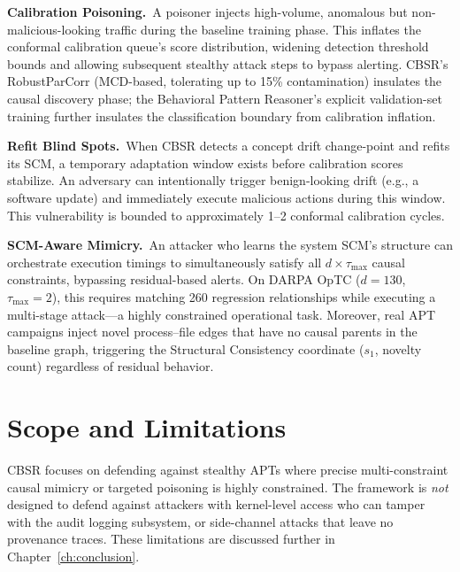 \textbf{Calibration Poisoning.}~A poisoner injects high-volume, anomalous but non-malicious-looking
traffic during the baseline training phase. This inflates the conformal calibration queue's score
distribution, widening detection threshold bounds and allowing subsequent stealthy attack steps to
bypass alerting. CBSR's RobustParCorr (MCD-based, tolerating up to 15\% contamination) insulates
the causal discovery phase; the Behavioral Pattern Reasoner's explicit validation-set training
further insulates the classification boundary from calibration inflation.

\textbf{Refit Blind Spots.}~When CBSR detects a concept drift change-point and refits its SCM,
a temporary adaptation window exists before calibration scores stabilize. An adversary can
intentionally trigger benign-looking drift (e.g., a software update) and immediately execute
malicious actions during this window. This vulnerability is bounded to approximately 1--2
conformal calibration cycles.

\textbf{SCM-Aware Mimicry.}~An attacker who learns the system SCM's structure can orchestrate
execution timings to simultaneously satisfy all $d \times \tau_{\max}$ causal constraints,
bypassing residual-based alerts. On DARPA OpTC ($d = 130$, $\tau_{\max} = 2$), this requires
matching 260 regression relationships while executing a multi-stage attack---a highly constrained
operational task. Moreover, real APT campaigns inject novel process--file edges that have no
causal parents in the baseline graph, triggering the Structural Consistency coordinate ($s_1$,
novelty count) regardless of residual behavior.

\section{Scope and Limitations}

CBSR focuses on defending against stealthy APTs where precise multi-constraint causal mimicry or
targeted poisoning is highly constrained. The framework is \emph{not} designed to defend against
attackers with kernel-level access who can tamper with the audit logging subsystem, or
side-channel attacks that leave no provenance traces. These limitations are discussed further in
Chapter~\ref{ch:conclusion}.
